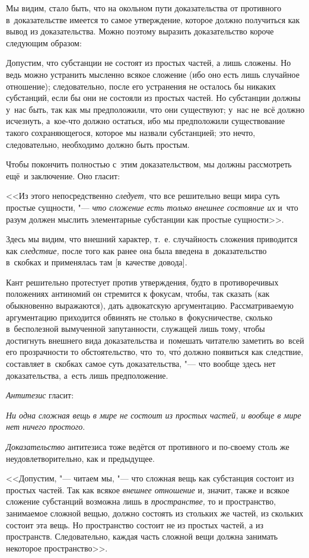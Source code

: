 Мы видим, стало быть, что на окольном пути доказательства от
противного в~доказательстве имеется то самое утверждение, которое
должно получиться как вывод из доказательства. Можно поэтому
выразить доказательство короче следующим образом:

Допустим, что субстанции не состоят из простых частей, а лишь сложены.
Но ведь можно устранить мысленно всякое сложение (ибо оно есть лишь случайное
отношение); следовательно, после его устранения не осталось бы никаких
субстанций, если бы они не состояли из простых частей. Но субстанции должны
у~нас быть, так как мы предположили, что они существуют; у~нас не~всё должно
исчезнуть, а~кое-что должно остаться, ибо мы предположили существование такого
сохраняющегося, которое мы назвали субстанцией; это нечто, следовательно,
необходимо должно быть простым.

Чтобы покончить полностью с~этим доказательством, мы должны рассмотреть
ещё~и заключение. Оно гласит:

<<Из этого непосредственно {\em следует,} что все решительно вещи мира суть
простые сущности, "--- {\em что сложение есть только внешнее состояние их}
и~что разум должен мыслить элементарные субстанции как простые сущности>>.

Здесь мы видим, что внешний характер, т.~е. случайность сложения приводится
как {\em следствие,} после того как ранее она была введена в~доказательство
в~скобках и применялась там [в~качестве довода].

Кант решительно протестует против утверждения, будто в противоречивых
положениях антиномий он стремится к фокусам, чтобы, так сказать (как
обыкновенно выражаются), дать адвокатскую аргументацию. Рассматриваемую
аргументацию приходится обвинять не столько в~фокусничестве, сколько
в~бесполезной вымученной запутанности, служащей лишь тому, чтобы достигнуть
внешнего вида доказательства и~помешать читателю заметить во~всей его
прозрачности то обстоятельство, что~то, чт\'{о} должно появиться как следствие,
составляет в~скобках самое суть доказательства, "--- что вообще здесь
нет доказательства, а~есть лишь предположение.

{\em Антитезис} гласит:

{\em Ни одна сложная вещь в мире не состоит из простых частей,
и вообще в мире нет ничего простого}.

{\em Доказательство} антитезиса тоже ведётся от противного и по-своему
столь же неудовлетворительно, как и предыдущее.

<<Допустим, "--- читаем мы, "--- что сложная вещь как субстанция состоит из
простых частей. Так как всякое {\em внешнее отношение} и, значит, также и
всякое сложение субстанций возможна лишь в {\em пространстве,} то
и пространство, занимаемое сложной вещью, должно состоять из стольких же
частей, из скольких состоит эта вещь. Но пространство состоит не из простых
частей, а из пространств. Следовательно, каждая часть сложной вещи должна занимать
некоторое пространство>>.

